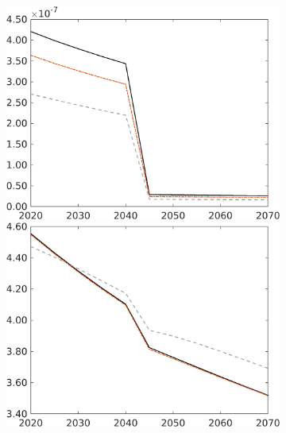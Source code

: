 \begin{figure}[h!!]
\begin{subfigure}{0.9\textwidth}
\begin{minipage}[]{0.32\textwidth}
\end{minipage}
\begin{minipage}[]{0.32\textwidth}
	\includegraphics[width=1\textwidth]{../../codding_model/own_basedOnFried/optimalPol_010922_revision/figures/all_13Sept22/CompRed_TaulCalib_gAf_spillover0_knspil0_nsk0_xgr0_sep0_LFlimit1_emsbase0_countec0_GovRev0_etaa0.79_lgd0.png}
\end{minipage}
\begin{minipage}[]{0.32\textwidth}
	\includegraphics[width=1\textwidth]{../../codding_model/own_basedOnFried/optimalPol_010922_revision/figures/all_13Sept22/CompRed_TaulCalib_gAn_spillover0_knspil0_nsk0_xgr0_sep0_LFlimit1_emsbase0_countec0_GovRev0_etaa0.79_lgd0.png}

\end{minipage}
\end{subfigure}
\end{figure}
